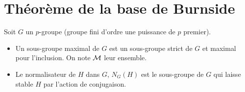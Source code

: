 
\section{Théorème de la base de Burnside}
	 

Soit $G$ un $p$-groupe (groupe fini d'ordre une puissance de $p$ premier).



\begin{de}
	\begin{itemize}
		\item Un sous-groupe maximal de $G$ est un sous-groupe strict de $G$ et maximal pour l'inclusion. On note $\mathcal{M}$ leur ensemble. 
		\item Le normalisateur de $H$ dans $G$, $N_G(H)$ est le sous-groupe de $G$ qui laisse stable $H$ par l'action de conjugaison.
	\end{itemize}
\end{de}



